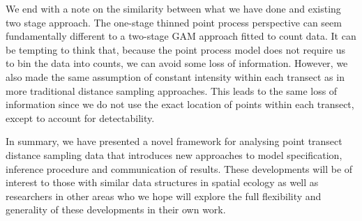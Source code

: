 \documentclass{stylefile16/statsoc}
\begin{document}
We end with a note on the similarity between what we have done and existing two stage approach.  The one-stage thinned point process perspective can seem fundamentally different to a two-stage GAM approach fitted to count data.  It can be tempting to think that, because the point process model does not require us to bin the data into counts, we can avoid some loss of information.  However, we also made the same assumption of constant intensity within each transect as in more traditional distance sampling approaches.  This leads to the same loss of information since we do not use the exact location of points within each transect, except to account for detectability.

In summary, we have presented a novel framework for analysing point transect distance sampling data that introduces new approaches to model specification, inference procedure and communication of results.  These developments will be of interest to those with similar data structures in spatial ecology as well as researchers in other areas who we hope will explore the full flexibility and generality of these developments in their own work.


\clearpage


\end{document}
